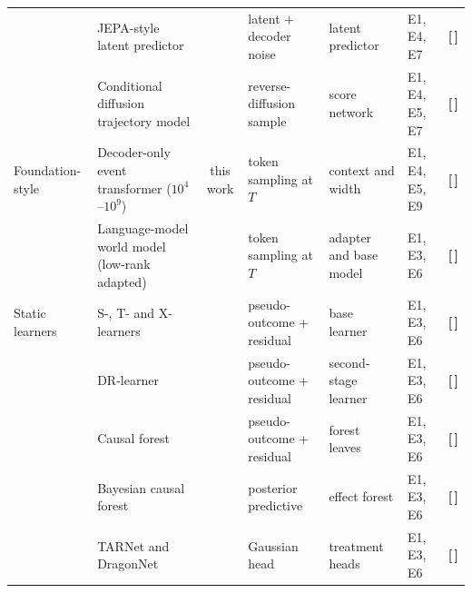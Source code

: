 \documentclass[11pt,a4paper]{article}
\newcommand{\T}{{\color{red}\textbf{[\,]}}}
\begin{document}
\begin{table}[!htbp]
\begin{tabularx}{\textwidth}{@{}p{1.7cm} Y c p{2.3cm} p{2.4cm} p{1.7cm} c@{}}
 & JEPA-style latent predictor & \cite{clinjepa2026} & latent + decoder noise & latent predictor & E1, E4, E7 & \T\\
 & Conditional diffusion trajectory model & \cite{tashiro2021csdi} & reverse-diffusion sample & score network & E1, E4, E5, E7 & \T\\
Foundation-style & Decoder-only event transformer ($10^4$--$10^9$) & this work & token sampling at $T$ & context and width & E1, E4, E5, E9 & \T\\
 & Language-model world model (low-rank adapted) & \cite{hu2022lora} & token sampling at $T$ & adapter and base model & E1, E3, E6 & \T\\
Static learners & S-, T- and X-learners & \cite{kunzel2019xlearner} & pseudo-outcome + residual & base learner & E1, E3, E6 & \T\\
 & DR-learner & \cite{kennedy2023drlearner} & pseudo-outcome + residual & second-stage learner & E1, E3, E6 & \T\\
 & Causal forest & \cite{wager2018} & pseudo-outcome + residual & forest leaves & E1, E3, E6 & \T\\
 & Bayesian causal forest & \cite{hahn2020bcf} & posterior predictive & effect forest & E1, E3, E6 & \T\\
 & TARNet and DragonNet & \cite{shalit2017tarnet,shi2019dragonnet} & Gaussian head & treatment heads & E1, E3, E6 & \T\\
\bottomrule\end{tabularx}
\end{table}
\FloatBarrier
\end{document}
